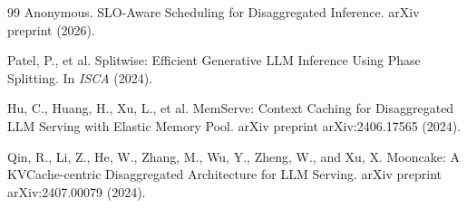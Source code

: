\documentclass[10pt,twocolumn,letterpaper]{article}
\begin{document}
\begin{thebibliography}{99}
Anonymous.
SLO-Aware Scheduling for Disaggregated Inference.
arXiv preprint (2026).

Patel, P., et al.
Splitwise: Efficient Generative LLM Inference Using Phase Splitting.
In \emph{ISCA} (2024).

Hu, C., Huang, H., Xu, L., et al.
MemServe: Context Caching for Disaggregated LLM Serving with Elastic Memory Pool.
arXiv preprint arXiv:2406.17565 (2024).

Qin, R., Li, Z., He, W., Zhang, M., Wu, Y., Zheng, W., and Xu, X.
Mooncake: A KVCache-centric Disaggregated Architecture for LLM Serving.
arXiv preprint arXiv:2407.00079 (2024).

\end{thebibliography}
\end{document}
